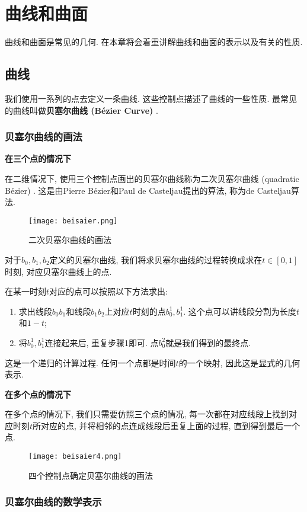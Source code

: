 \chapter{曲线和曲面}
曲线和曲面是常见的几何. 在本章将会着重讲解曲线和曲面的表示以及有关的性质. 

\section{曲线}
我们使用一系列的点去定义一条曲线. 这些控制点描述了曲线的一些性质. 最常见的曲线叫做\textbf{贝塞尔曲线 (B\'ezier Curve) }. 
\subsection{贝塞尔曲线的画法}
\textbf{在三个点的情况下}

在二维情况下, 使用三个控制点画出的贝塞尔曲线称为二次贝塞尔曲线 (quadratic B\'ezier) . 这是由Pierre B\'ezier和Paul de Casteljau提出的算法, 称为de Casteljau算法. 

\begin{figure}[H]
	\centering
	\texttt{[image: beisaier.png]}
	\caption{二次贝塞尔曲线的画法}
	\label{fig:beisaier}
\end{figure}
对于$b_0,b_1,b_2$定义的贝塞尔曲线, 我们将求贝塞尔曲线的过程转换成求在$t\in [0,1]$时刻, 对应贝塞尔曲线上的点. 

在某一时刻$t$对应的点可以按照以下方法求出: 
\begin{enumerate}
	\item 求出线段$b_0b_1$和线段$b_1b_2$上对应$t$时刻的点$b_0^1,b_1^1$. 这个点可以讲线段分割为长度$t$和$1-t$; 
	\item 将$b_0^1,b_1^1$连接起来后, 重复步骤1即可. 点$b_0^2$就是我们得到的最终点. 
\end{enumerate}
这是一个递归的计算过程. 任何一个点都是时间$t$的一个映射, 因此这是显式的几何表示. 

\textbf{在多个点的情况下}

在多个点的情况下, 我们只需要仿照三个点的情况, 每一次都在对应线段上找到对应时刻$t$所对应的点, 并将相邻的点连成线段后重复上面的过程, 直到得到最后一个点. 

\begin{figure}[H]
\centering
\texttt{[image: beisaier4.png]}
\caption{四个控制点确定贝塞尔曲线的画法}
\label{fig:beisaier4}
\end{figure}

\subsection{贝塞尔曲线的数学表示}

